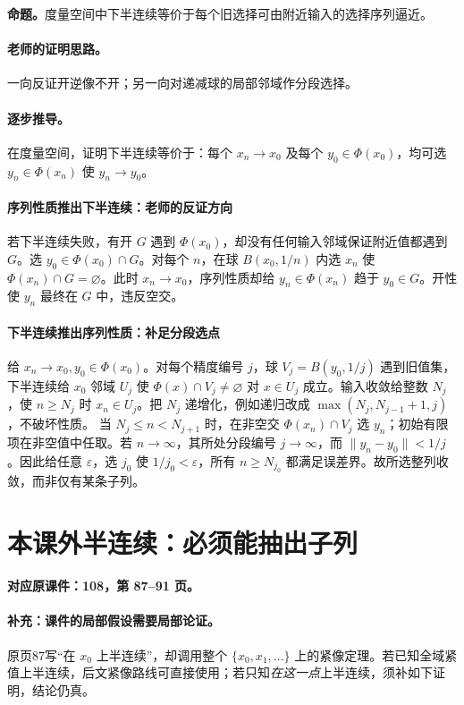 \documentclass[11pt,a4paper]{article}
\newcommand{\eps}{\varepsilon}
\theoremstyle{definition}\newtheorem{definition}{定义}\newtheorem{example}{例}
\begin{document}
\textbf{命题。}度量空间中下半连续等价于每个旧选择可由附近输入的选择序列逼近。

\paragraph{老师的证明思路。}一向反证开逆像不开；另一向对递减球的局部邻域作分段选择。

\paragraph{逐步推导。}
在度量空间，证明下半连续等价于：每个 $x_n\to x_0$ 及每个 $y_0\in\Phi(x_0)$，均可选 $y_n\in\Phi(x_n)$ 使 $y_n\to y_0$。
\paragraph{序列性质推出下半连续：老师的反证方向}
若下半连续失败，有开 $G$ 遇到 $\Phi(x_0)$，却没有任何输入邻域保证附近值都遇到 $G$。选 $y_0\in\Phi(x_0)\cap G$。对每个 $n$，在球 $B(x_0,1/n)$ 内选 $x_n$ 使 $\Phi(x_n)\cap G=\varnothing$。此时 $x_n\to x_0$，序列性质却给 $y_n\in\Phi(x_n)$ 趋于 $y_0\in G$。开性使 $y_n$ 最终在 $G$ 中，违反空交。
\paragraph{下半连续推出序列性质：补足分段选点}
给 $x_n\to x_0,y_0\in\Phi(x_0)$。对每个精度编号 $j$，球 $V_j=B(y_0,1/j)$ 遇到旧值集，下半连续给 $x_0$ 邻域 $U_j$ 使 $\Phi(x)\cap V_j\ne\varnothing$ 对 $x\in U_j$ 成立。输入收敛给整数 $N_j$，使 $n\ge N_j$ 时 $x_n\in U_j$。把 $N_j$ 递增化，例如递归改成 $\max(N_j,N_{j-1}+1,j)$，不破坏性质。
当 $N_j\le n<N_{j+1}$ 时，在非空交 $\Phi(x_n)\cap V_j$ 选 $y_n$；初始有限项在非空值中任取。若 $n\to\infty$，其所处分段编号 $j\to\infty$，而 $\|y_n-y_0\|<1/j$。因此给任意 $\eps$，选 $j_0$ 使 $1/j_0<\eps$，所有 $n\ge N_{j_0}$ 都满足误差界。故所选整列收敛，而非仅有某条子列。


\clearpage\section{本课外半连续：必须能抽出子列}\label{g:108:87}

\textbf{对应原课件：108，第 87--91 页。}


\paragraph{补充：课件的局部假设需要局部论证。}
原页87写“在 $x_0$ 上半连续”，却调用整个 $\{x_0,x_1,\ldots\}$ 上的紧像定理。若已知全域紧值上半连续，后文紧像路线可直接使用；若只知\emph{在这一点}上半连续，须补如下证明，结论仍真。
\end{document}
